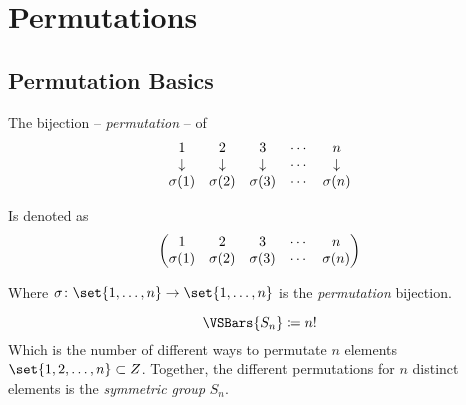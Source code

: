 \chapter{Permutations}

\section{Permutation Basics}

\begin{definition}[Permutation]
    The bijection -- \textit{permutation} -- of
    \begin{equation}
        \begin{matrix}
            1 &2 &3 &\cdots &n \\
            \downarrow &\downarrow &\downarrow &\cdots &\downarrow \\
            \sigma({1}) &\sigma({2}) &\sigma({3}) &\cdots &\sigma({n})
        \end{matrix}
    \end{equation}
    
    Is denoted as
    \begin{equation}
        \begin{pmatrix}
            1             & 2             & 3             & \cdots & n            \\
            \sigma({1}) & \sigma({2}) & \sigma({3}) & \cdots & \sigma({n}) \\
        \end{pmatrix}
    \end{equation}
    
    Where $\sigma \colon \set{1, \dots, n} \to \set{1, \dots, n}$ is the \textit{permutation} bijection.
\end{definition}

\begin{definition}
    \begin{equation}
        \VSBars{S_n} \coloneqq n!
    \end{equation}
    Which is the number of different ways to permutate $n$ elements $\set{1, 2, \dots, n} \subset \Int$. Together, the different permutations for $n$ distinct elements is the \textit{symmetric group} $S_n$.
\end{definition}

